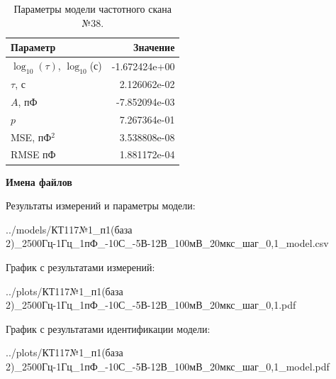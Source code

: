 \begin{table}[!ht]
    \centering
    \caption{Параметры модели частотного скана №38.}
    \begin{tabular}{|l|r|}
        \hline
        Параметр                                       & Значение                  \\ \hline
        $\log_{10}(\tau)$, $\log_{10}$(с)              & -1.672424e+00             \\ \hline
        $\tau$, с                                      & 2.126062e-02              \\ \hline
        $A$, пФ                                        & -7.852094e-03             \\ \hline
        $p$                                            & 7.267364e-01              \\ \hline
        MSE, пФ$^2$                                    & 3.538808e-08              \\ \hline
        RMSE пФ                                        & 1.881172e-04              \\ \hline
    \end{tabular}
    \label{table:frequency_scan_model_38}
\end{table}

\textbf{Имена файлов}

Результаты измерений и параметры модели:

\scriptsize../models/КТ117№1\_п1(база 2)\_2500Гц-1Гц\_1пФ\_-10С\_-5В-12В\_100мВ\_20мкс\_шаг\_0,1\_model.csv
\normalsize

График с результатами измерений:

\scriptsize../plots/КТ117№1\_п1(база 2)\_2500Гц-1Гц\_1пФ\_-10С\_-5В-12В\_100мВ\_20мкс\_шаг\_0,1.pdf
\normalsize

График с результатами идентификации модели:

\scriptsize../plots/КТ117№1\_п1(база 2)\_2500Гц-1Гц\_1пФ\_-10С\_-5В-12В\_100мВ\_20мкс\_шаг\_0,1\_model.pdf
\normalsize

